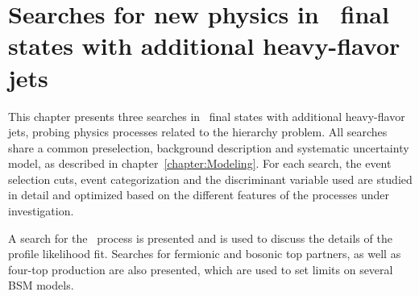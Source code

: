 \chapter{\texorpdfstring{Searches for new physics in \ttbar\ final states with additional heavy-flavor jets}{Searches for new physics in tt final states with additional heavy-flavor jets}}
\label{chapter:Analysis}

This chapter presents three searches in \ttbar\ final states with additional heavy-flavor jets, probing physics processes related to the hierarchy problem. All searches share a common preselection, background description and systematic uncertainty model, as described in chapter~\ref{chapter:Modeling}. 
For each search, the event selection cuts, event categorization and the discriminant variable used are studied in detail and optimized based on the different features of the processes under investigation.

A search for the \ttH\ process is presented and is used to discuss the details of the profile likelihood fit. Searches for fermionic and bosonic top partners, as well as four-top production are also presented, which are used to set limits on several BSM models.






\clearpage


